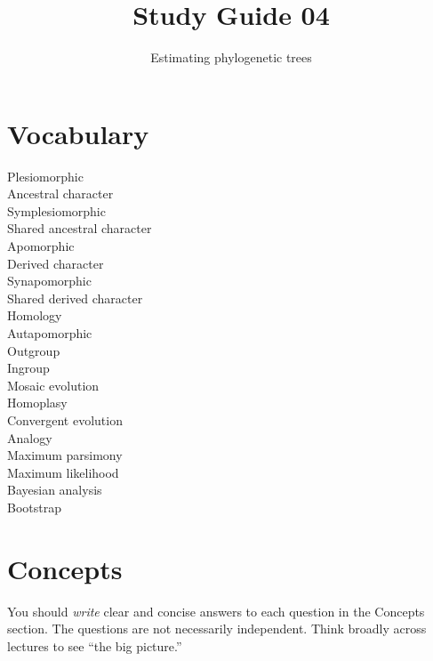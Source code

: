 \documentclass[letterpaper]{tufte-handout}
\title{Study Guide 04\hfill}
\author{Estimating phylogenetic trees}
\date{} %
\begin{document}
\maketitle	%

\section{Vocabulary}

\begin{multicols}{2}
Plesiomorphic\\
Ancestral character \\
Symplesiomorphic \\
Shared ancestral character \\
Apomorphic \\
Derived character \\
Synapomorphic \\
Shared derived character \\
Homology \\
Autapomorphic \\
Outgroup \\
Ingroup \\
Mosaic evolution \\
Homoplasy \\
Convergent evolution \\
Analogy \\
Maximum parsimony \\
Maximum likelihood \\
Bayesian analysis \\
Bootstrap \\
\end{multicols}


\section{Concepts}

You should \emph{write} clear and concise answers to each question in the Concepts section.  The questions are not necessarily independent.  Think broadly across lectures to see ``the big picture.'' 
\end{document}
